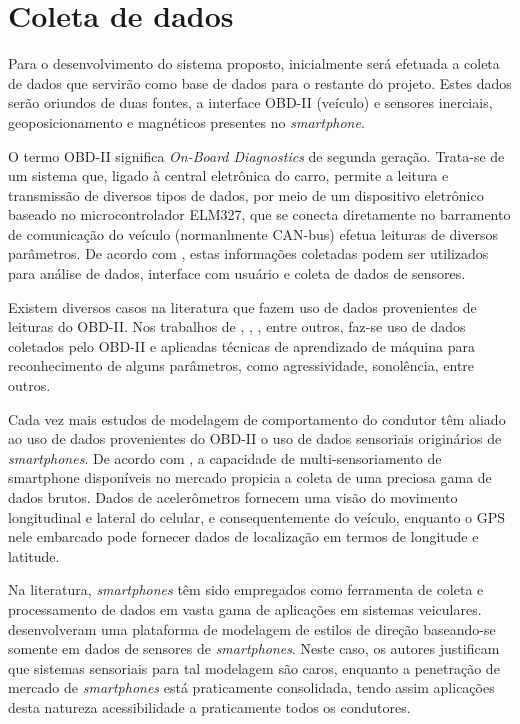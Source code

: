 \section{Coleta de dados}

Para o desenvolvimento do sistema proposto, inicialmente será efetuada a coleta de dados que servirão como base de dados para o restante do projeto. Estes dados serão oriundos de duas fontes, a interface OBD-II (veículo) e sensores inerciais, geoposicionamento e magnéticos presentes no \textit{smartphone}.

O termo OBD-II significa \textit{On-Board Diagnostics} de segunda geração. Trata-se de um sistema que, ligado à central eletrônica do carro, permite a leitura e transmissão de diversos tipos de dados, por meio de um dispositivo eletrônico baseado no microcontrolador ELM327, que se conecta diretamente no barramento de comunicação do veículo (normanlmente CAN-bus) efetua leituras de diversos parâmetros. De acordo com , estas informações coletadas podem ser utilizados para análise de dados, interface com usuário e coleta de dados de sensores.

Existem diversos casos na literatura que fazem uso de dados provenientes de leituras do OBD-II. Nos trabalhos de , , , entre outros, faz-se uso de dados coletados pelo OBD-II e aplicadas técnicas de aprendizado de máquina para reconhecimento de alguns parâmetros, como agressividade, sonolência, entre outros.

Cada vez mais estudos de modelagem de comportamento do condutor têm aliado ao uso de dados provenientes do OBD-II o uso de dados sensoriais originários de \textit{smartphones}. De acordo com , a capacidade de multi-sensoriamento de smartphone disponíveis no mercado propicia a coleta de uma preciosa gama de dados brutos. Dados de acelerômetros fornecem uma visão do movimento longitudinal e lateral do celular, e consequentemente do veículo, enquanto o GPS nele embarcado pode fornecer dados de localização em termos de longitude e latitude.

Na literatura, \textit{smartphones} têm sido empregados como ferramenta de coleta e processamento de dados em vasta gama de aplicações em sistemas veiculares.  desenvolveram uma plataforma de modelagem de estilos de direção baseando-se somente em dados de sensores de \textit{smartphones}. Neste caso, os autores justificam que sistemas sensoriais para tal modelagem são caros, enquanto a penetração de mercado de \textit{smartphones} está praticamente consolidada, tendo assim aplicações desta natureza acessibilidade a praticamente todos os condutores.

